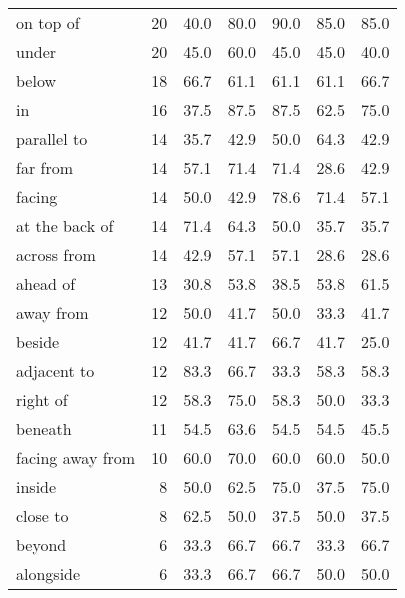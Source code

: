 \begin{table}[ht]
\begin{adjustbox}{max width=0.7\textwidth}
\begin{tabular}{lrrrrrr}
on top of            &      20 &        40.0 &    80.0 &  90.0 &        85.0 &        85.0 \\
under                &      20 &        45.0 &    60.0 &  45.0 &        45.0 &        40.0 \\
below                &      18 &        66.7 &    61.1 &  61.1 &        61.1 &        66.7 \\
in                   &      16 &        37.5 &    87.5 &  87.5 &        62.5 &        75.0 \\
parallel to          &      14 &        35.7 &    42.9 &  50.0 &        64.3 &        42.9 \\
far from             &      14 &        57.1 &    71.4 &  71.4 &        28.6 &        42.9 \\
facing               &      14 &        50.0 &    42.9 &  78.6 &        71.4 &        57.1 \\
at the back of       &      14 &        71.4 &    64.3 &  50.0 &        35.7 &        35.7 \\
across from          &      14 &        42.9 &    57.1 &  57.1 &        28.6 &        28.6 \\
ahead of             &      13 &        30.8 &    53.8 &  38.5 &        53.8 &        61.5 \\
away from            &      12 &        50.0 &    41.7 &  50.0 &        33.3 &        41.7 \\
beside               &      12 &        41.7 &    41.7 &  66.7 &        41.7 &        25.0 \\
adjacent to          &      12 &        83.3 &    66.7 &  33.3 &        58.3 &        58.3 \\
right of             &      12 &        58.3 &    75.0 &  58.3 &        50.0 &        33.3 \\
beneath              &      11 &        54.5 &    63.6 &  54.5 &        54.5 &        45.5 \\
facing away from     &      10 &        60.0 &    70.0 &  60.0 &        60.0 &        50.0 \\
inside               &       8 &        50.0 &    62.5 &  75.0 &        37.5 &        75.0 \\
close to             &       8 &        62.5 &    50.0 &  37.5 &        50.0 &        37.5 \\
beyond               &       6 &        33.3 &    66.7 &  66.7 &        33.3 &        66.7 \\
alongside            &       6 &        33.3 &    66.7 &  66.7 &        50.0 &        50.0 \\

\end{tabular}
\end{adjustbox}
\end{table}
